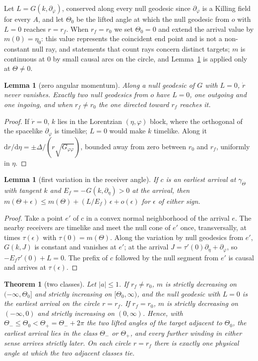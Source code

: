 \documentclass[aip,jmp,amsmath,amssymb,reprint]{revtex4-2}
\newcommand{\dd}{\mathrm{d}}
\theoremstyle{plain}
\newtheorem{theorem}{Theorem}
\newtheorem{lemma}[proposition]{Lemma}
\theoremstyle{definition}
\begin{document}
Let $L=G(k,\partial_\varphi)$, conserved along every null geodesic since $\partial_\varphi$ is a Killing field for
every $A$, and let $\Theta_0$ be the lifted angle at which the null geodesic from $o$ with $L=0$ reaches
$r=r_f$. When $r_f=r_0$ we set $\Theta_0=0$ and extend the arrival value by $m(0)=\eta_0$: this value
represents the coincident end point and is not a non-constant null ray, and statements that
count rays concern distinct targets; $m$ is continuous at $0$ by small causal arcs on the circle,
and Lemma~\ref{lem:kerr-V} is applied only at $\Theta\ne0$.

\begin{lemma}[zero angular momentum]\label{lem:kerr-Z}
Along a null geodesic of $G$ with $L=0$, $\dot r$ never vanishes. Exactly two null geodesics from $o$
have $L=0$, one outgoing and one ingoing, and when $r_f\ne r_0$ the one directed toward $r_f$ reaches
it.
\end{lemma}

\begin{proof}
If $\dot r=0$, $k$ lies in the Lorentzian $(\eta,\varphi)$ block, where the orthogonal of the spacelike
$\partial_\varphi$ is timelike; $L=0$ would make $k$ timelike. Along it
$\dd r/\dd\eta=\pm\Delta/(r\sqrt{G_{\varphi\varphi}})$, bounded away from zero between $r_0$ and $r_f$, uniformly in $\eta$.
\end{proof}

\begin{lemma}[first variation in the receiver angle]\label{lem:kerr-V}
If $c$ is an earliest arrival at $\gamma_{\Theta}$ with tangent $k$ and $E_f=-G(k,\partial_\eta)>0$ at the arrival, then
$m(\Theta+\epsilon)\le m(\Theta)+(L/E_f)\,\epsilon+o(\epsilon)$ for $\epsilon$ of either sign.
\end{lemma}

\begin{proof}
Take a point $e'$ of $c$ in a convex normal neighborhood of the arrival $e$. The nearby receivers
are timelike and meet the null cone of $e'$ once, transversally, at times $\tau(\epsilon)$ with
$\tau(0)=m(\Theta)$. Along the variation by null geodesics from $e'$, $G(k,J)$ is constant and vanishes at $e'$;
at the arrival $J=\tau'(0)\partial_\eta+\partial_\varphi$, so $-E_f\tau'(0)+L=0$. The prefix of $c$ followed by the null
segment from $e'$ is causal and arrives at $\tau(\epsilon)$.
\end{proof}

\begin{theorem}[two classes]\label{thm:kerr-W}
Let $|a|\le1$. If $r_f\ne r_0$, $m$ is strictly decreasing on $(-\infty,\Theta_0]$ and strictly increasing on
$[\Theta_0,\infty)$, and the null geodesic with $L=0$ is the earliest arrival on the circle $r=r_f$. If
$r_f=r_0$, $m$ is strictly decreasing on $(-\infty,0)$ and strictly increasing on $(0,\infty)$. Hence, with
$\Theta_-\le\Theta_0<\Theta_+=\Theta_-+2\pi$ the two lifted angles of the target adjacent to $\Theta_0$, the earliest arrival
lies in the class $\Theta_-$ or $\Theta_+$, and every further winding in either sense arrives strictly
later. On each circle $r=r_f$ there is exactly one physical angle at which the two adjacent classes
tie.
\end{theorem}
\end{document}
